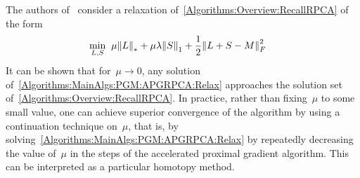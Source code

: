 \documentclass{../../common/projectreport}
\begin{document}
The authors of~\cite{Lin:2009kx} consider a relaxation of~\eqref{Algorithms:Overview:RecallRPCA} of the form
%
\begin{align}
\min_{L,S} \;\; &\mu {\left\|L\right\|}_{*}^{} + \mu \lambda {\left\|S\right\|}_{1}^{} + \frac{1}{2} {\left\|L+S-M\right\|}_{F}^{2} 
\label{Algorithms:MainAlgs:PGM:APGRPCA:Relax}
\end{align}
%
It can be shown that for~$\mu \rightarrow 0$, any solution of~\eqref{Algorithms:MainAlgs:PGM:APGRPCA:Relax} approaches the solution set of~\eqref{Algorithms:Overview:RecallRPCA}. In practice, rather than fixing~$\mu$ to some small value, one can achieve superior convergence of the algorithm by using a continuation technique on~$\mu$, that is, by solving~\eqref{Algorithms:MainAlgs:PGM:APGRPCA:Relax} by repeatedly decreasing the value of~$\mu$ in the steps of the accelerated proximal gradient algorithm. This can be interpreted as a particular homotopy method. 
\end{document}
